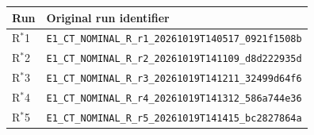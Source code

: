 \begin{tabular}{ll}
\toprule
Run & Original run identifier \\
\midrule
R$^{*}$1 & \texttt{E1\_CT\_NOMINAL\_R\_r1\_20261019T140517\_0921f1508b} \\
R$^{*}$2 & \texttt{E1\_CT\_NOMINAL\_R\_r2\_20261019T141109\_d8d222935d} \\
R$^{*}$3 & \texttt{E1\_CT\_NOMINAL\_R\_r3\_20261019T141211\_32499d64f6} \\
R$^{*}$4 & \texttt{E1\_CT\_NOMINAL\_R\_r4\_20261019T141312\_586a744e36} \\
R$^{*}$5 & \texttt{E1\_CT\_NOMINAL\_R\_r5\_20261019T141415\_bc2827864a} \\
\bottomrule
\end{tabular}
